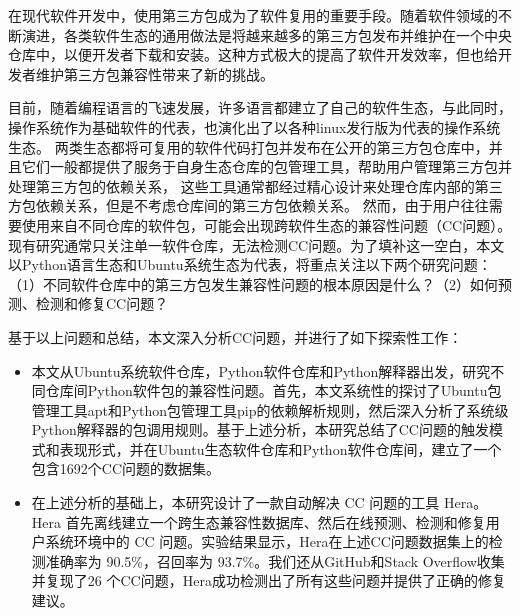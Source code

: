 \begin{cabstract}
在现代软件开发中，使用第三方包成为了软件复用的重要手段。随着软件领域的不断演进，各类软件生态的通用做法是将越来越多的第三方包发布并维护在一个中央仓库中，以便开发者下载和安装。这种方式极大的提高了软件开发效率，但也给开发者维护第三方包兼容性带来了新的挑战。

目前，随着编程语言的飞速发展，许多语言都建立了自己的软件生态，与此同时，操作系统作为基础软件的代表，也演化出了以各种linux发行版为代表的操作系统生态。
两类生态都将可复用的软件代码打包并发布在公开的第三方包仓库中，并且它们一般都提供了服务于自身生态仓库的包管理工具，帮助用户管理第三方包并处理第三方包的依赖关系，
这些工具通常都经过精心设计来处理仓库内部的第三方包依赖关系，但是不考虑仓库间的第三方包依赖关系。
然而，由于用户往往需要使用来自不同仓库的软件包，可能会出现跨软件生态的兼容性问题（CC问题）。现有研究通常只关注单一软件仓库，无法检测CC问题。为了填补这一空白，本文以Python语言生态和Ubuntu系统生态为代表，将重点关注以下两个研究问题：（1）不同软件仓库中的第三方包发生兼容性问题的根本原因是什么？（2）如何预测、检测和修复CC问题？

基于以上问题和总结，本文深入分析CC问题，并进行了如下探索性工作：
\begin{itemize}
	\item 本文从Ubuntu系统软件仓库，Python软件仓库和Python解释器出发，研究不同仓库间Python软件包的兼容性问题。首先，本文系统性的探讨了Ubuntu包管理工具apt和Python包管理工具pip的依赖解析规则，然后深入分析了系统级Python解释器的包调用规则。基于上述分析，本研究总结了CC问题的触发模式和表现形式，并在Ubuntu生态软件仓库和Python软件仓库间，建立了一个包含1692个CC问题的数据集。
	\item 在上述分析的基础上，本研究设计了一款自动解决 CC 问题的工具 Hera。Hera 首先离线建立一个跨生态兼容性数据库、然后在线预测、检测和修复用户系统环境中的 CC 问题。实验结果显示，Hera在上述CC问题数据集上的检测准确率为 90.5\%，召回率为 93.7\%。我们还从GitHub和Stack Overflow收集并复现了26 个CC问题，Hera成功检测出了所有这些问题并提供了正确的修复建议。
\end{itemize}
\end{cabstract}

